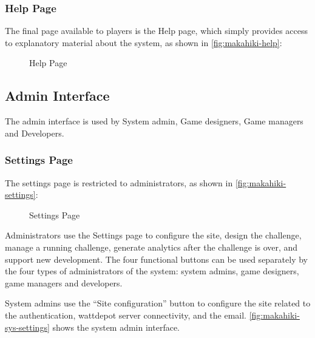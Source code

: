\clearpage

\subsubsection{Help Page}

The final page available to players is the Help page, which simply provides access to explanatory material about the system, as shown in \autoref{fig:makahiki-help}:

\begin{figure}[!ht]
\begin{center}
\end{center}
\caption{Help Page}
\label{fig:makahiki-help}
\end{figure}

\clearpage

\subsection{Admin Interface}
The admin interface is used by System admin, Game designers, Game managers and Developers.

\subsubsection{Settings Page}

The settings page is restricted to administrators, as shown in \autoref{fig:makahiki-settings}: 

\begin{figure}[!ht]
\begin{center}
\end{center}
\caption{Settings Page}
\label{fig:makahiki-settings}
\end{figure}

Administrators use the Settings page to configure the site, design the challenge, manage a running challenge, generate analytics after the challenge is over, and support new development. The four functional buttons can be used separately by the four types of administrators of the system: system admins, game designers, game managers and developers. 

\clearpage

System admins use the ``Site configuration'' button to configure the site related to the authentication, wattdepot server connectivity, and the email. \autoref{fig:makahiki-sys-settings} shows the system admin interface.

